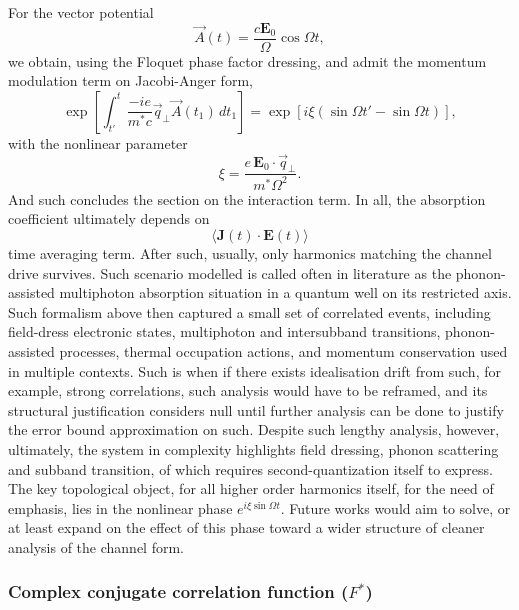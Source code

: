 \documentclass[%
 reprint,
 amsmath,amssymb,
 aps,
]{revtex4-2}
\begin{document}
For the vector potential
\begin{equation}
\vec{A}(t)
=
\frac{c\mathbf{E}_0}{\Omega}
\cos \Omega t,
\end{equation}
we obtain, using the Floquet phase factor dressing, and admit the momentum modulation term on Jacobi-Anger form, 
\begin{equation}
\exp\left[
\int_{t'}^{t}
\frac{-ie}{m^* c}
\vec{q}_{\perp}
\vec{A}(t_1)
\, dt_1
\right]
=
\exp\left[
i\xi
(\sin \Omega t' - \sin \Omega t)
\right],
\end{equation}
with the nonlinear parameter
\begin{equation}
\xi
=
\frac{e\,\mathbf{E}_0\cdot\vec{q}_{\perp}}
{m^* \Omega^2}.
\end{equation}
And such concludes the section on the interaction term. In all, the absorption coefficient ultimately depends on
\begin{equation}
    \langle \mathbf{J}(t) \cdot \mathbf{E}(t)\rangle
\end{equation}
time averaging term. After such, usually, only harmonics matching the channel drive survives. Such scenario modelled is called often in literature as the phonon-assisted multiphoton absorption situation in a quantum well on its restricted axis. Such formalism above then captured a small set of correlated events, including field-dress electronic states, multiphoton and intersubband transitions, phonon-assisted processes, thermal occupation actions, and momentum conservation used in multiple contexts. Such is when if there exists idealisation drift from such, for example, strong correlations, such analysis would have to be reframed, and its structural justification considers null until further analysis can be done to justify the error bound approximation on such. Despite such lengthy analysis, however, ultimately, the system in complexity highlights field dressing, phonon scattering and subband transition, of which requires second-quantization itself to express. The key topological object, for all higher order harmonics itself, for the need of emphasis, lies in the nonlinear phase $e^{i\xi \sin{\Omega}t}$. Future works would aim to solve, or at least expand on the effect of this phase toward a wider structure of cleaner analysis of the channel form. 
\subsubsection{Complex conjugate correlation function ($F^*$)}
\end{document}
